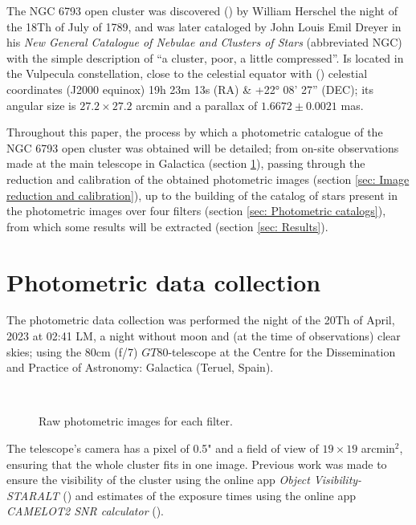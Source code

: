 \documentclass{aa}
\begin{document}
    The NGC 6793 open cluster was discovered (\cite{Seligman_2018}) by William Herschel the night of the 18Th of July of 1789, and was later cataloged by John Louis Emil Dreyer in his \textit{New General Catalogue of Nebulae and Clusters of Stars} (abbreviated NGC) with the simple description of ``a cluster, poor, a little compressed''. Is located in the Vulpecula constellation, close to the celestial equator with (\cite{SIMBAD}) celestial coordinates (J2000 equinox) 19h 23m 13s (RA) \& +22° 08’ 27” (DEC); its angular size is $27.2\times27.2$ arcmin and a parallax of $1.6672\pm 0.0021$ mas. 

    Throughout this paper, the process by which a photometric catalogue of the NGC 6793 open cluster was obtained will be detailed; from on-site observations made at the main telescope in Galactica (section \ref{sec: Photometric data collection}), passing through the reduction and calibration of the obtained photometric images (section \ref{sec: Image reduction and calibration}), up to the building of the catalog of stars present in the photometric images over four filters (section \ref{sec: Photometric catalogs}), from which some results will be extracted (section \ref{sec: Results}).
    \section{Photometric data collection}\label{sec: Photometric data collection}
    The photometric data collection was performed the night of the 20Th of April, 2023 at 02:41 LM, a night without moon and (at the time of observations) clear skies; using the 80cm (f/7) $GT80$-telescope at the Centre for the Dissemination and Practice of Astronomy: Galactica (Teruel, Spain). 
    \begin{figure}[H]
      \centering
      \quad
      \\
      \quad
      \caption{Raw photometric images for each filter.}
      \label{fig: Raw  Images}
    \end{figure}
    
    The telescope's  camera has a pixel of 0.5" and a field of view of $19\times19$ arcmin$^2$, ensuring that the whole cluster fits in one image. Previous work was made to ensure the visibility of the cluster using the online app \textit{Object Visibility-STARALT} (\cite{STARALT}) and estimates of the exposure times using the online app \textit{CAMELOT2 SNR calculator} (\cite{EXP_Calculator}).
    
\end{document}
